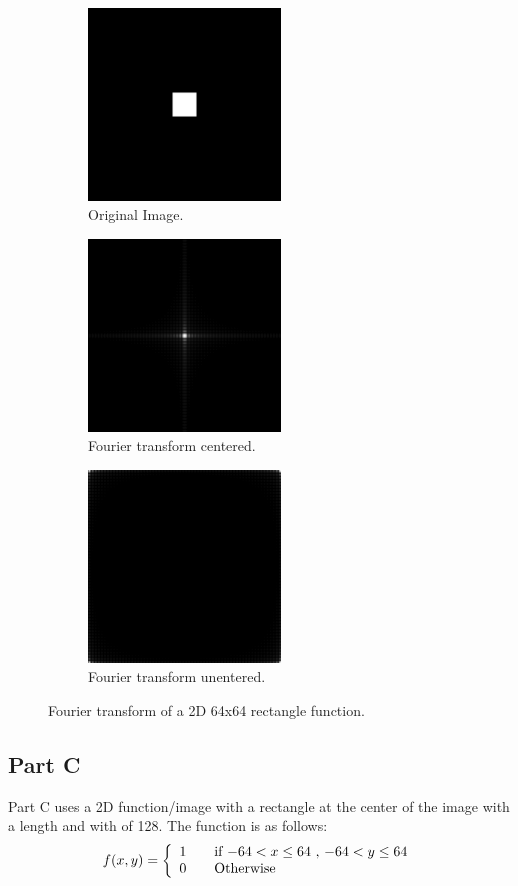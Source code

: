 \documentclass[letter]{article}
\begin{document}
\begin{figure}[hbtp]
  \centering
  \begin{subfigure}{5.1cm}
    \includegraphics[width=5.1cm]{images/rect_512_64x64.png}
    \caption{Original Image.}
  \end{subfigure}
  \begin{subfigure}{5.1cm}
    \includegraphics[width=5.1cm]{images/rect_512_64x64_FU_centered.png}
    \caption{Fourier transform centered.}
  \end{subfigure}
  \begin{subfigure}{5.1cm}
    \includegraphics[width=5.1cm]{images/rect_512_64x64_FU.png}
    \caption{Fourier transform unentered.}
  \end{subfigure}
  \caption{Fourier transform of a 2D 64x64 rectangle function.}
  \label{fig:ft_6464}
\end{figure}
\subsection{Part C}
Part C uses a 2D function/image with a rectangle at the center of the image with a length and with of 128. The function is as follows: $$f(x,y) = \left \{ \begin{array}{l l} 1 & \quad \text{if $-64 < x \leq 64$ , $-64 < y \leq 64$}\\ 0 & \quad \text{Otherwise}\end{array} \right.$$
\end{document}
